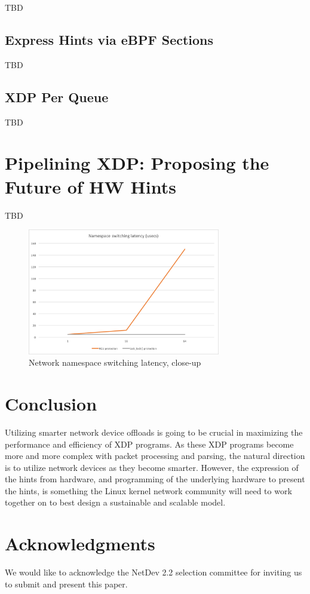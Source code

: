 \documentclass[letterpaper]{article}
\begin{document}
TBD

\subsection{Express Hints via eBPF Sections}

TBD

\subsection{XDP Per Queue}

TBD

\section{Pipelining XDP: Proposing the Future of HW Hints}

TBD

\begin{figure}[h]
\includegraphics[width=3.31in]{close-up-latency.png}
\caption{Network namespace switching latency, close-up}
\label{close-latency}
\end{figure}

\section{Conclusion}
Utilizing smarter network device offloads is going to be crucial in maximizing the performance and efficiency of XDP programs.  As these XDP programs become more and more complex with packet processing and parsing, the natural direction is to utilize network devices as they become smarter.  However, the expression of the hints from hardware, and programming of the underlying hardware to present the hints, is something the Linux kernel network community will need to work together on to best design a sustainable and scalable model.

\section{Acknowledgments}
We would like to acknowledge the NetDev 2.2 selection committee for inviting us to submit and present this paper.
\end{document}
